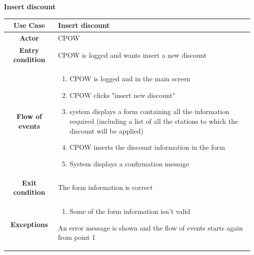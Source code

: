 \documentclass[table, 12pt]{article} %
\begin{document}
\begin{itemize}
            \begin{table}[H]
                \item[] \textbf{Insert discount}
                \item[]
                \centering
                \begin{tabular}{|c |m{}|}
                    \hline
                    \textbf{Use Case} & Insert discount\\ \hline
                    \textbf{Actor} & CPOW\\ \hline
                    \textbf{Entry condition} & CPOW is logged and wants insert a new discount \\  \hline
                    \textbf{Flow of events} & \begin{enumerate}
                                                \item CPOW is logged and in the main screen
                                                \item CPOW clicks "insert new discount"
                                                \item system displays a form containing all the information required (including a list of all the stations to which the discount will be applied)
                                                \item CPOW inserts the discount information in the form
                                                \item System displays a confirmation message
                                            \end{enumerate}\\ \hline
                    \textbf{Exit condition} &  The form information is correct \\ \hline
                    \textbf{Exceptions} &  \begin{enumerate}
                        \item Some of the form information isn't valid
                    \end{enumerate}
                    An error message is shown and the flow of events starts again from point 1\\ \hline
                \end{tabular}
            \end{table}


\end{itemize}
\end{document}

